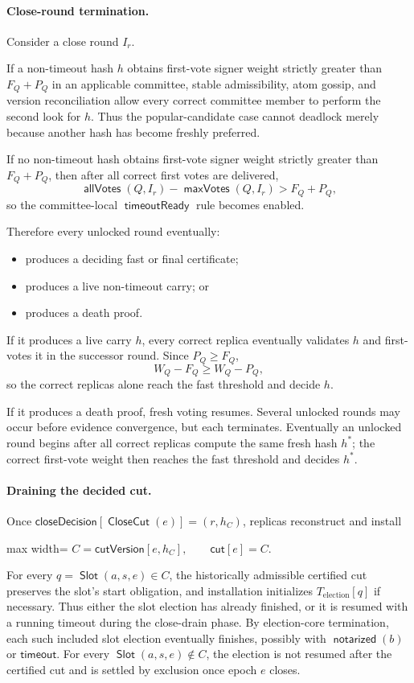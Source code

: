 \documentclass[sigplan,twocolumn,review,anonymous]{acmart}
\newcommand{\func}[1]{\operatorname{\mathsf{#1}}}
\newcommand{\allVotes}{\func{allVotes}}
\newcommand{\maxVotes}{\func{maxVotes}}
\newcommand{\Slot}{\func{Slot}}
\newcommand{\CloseCut}{\func{CloseCut}}
\newcommand{\closeDecision}{\mathsf{closeDecision}}
\newcommand{\timeoutOutcome}{\mathsf{timeout}}
\newcommand{\notarized}{\func{notarized}}
\newcommand{\timeoutReady}{\func{timeoutReady}}
\newcommand{\closeCut}{\mathsf{cut}}
\newcommand{\cutVersion}{\mathsf{cutVersion}}
\begin{document}
\paragraph{Close-round termination.}
Consider a close round \(I_r\).

If a non-timeout hash \(h\) obtains first-vote signer weight strictly greater than \(F_Q+P_Q\) in an
applicable committee, stable admissibility, atom gossip, and version reconciliation allow every correct
committee member to perform the second look for \(h\).  Thus the popular-candidate case cannot deadlock
merely because another hash has become freshly preferred.

If no non-timeout hash obtains first-vote signer weight strictly greater than \(F_Q+P_Q\), then after
all correct first votes are delivered,
\[
\allVotes(Q,I_r)-\maxVotes(Q,I_r)>F_Q+P_Q,
\]
so the committee-local \(\timeoutReady\) rule becomes enabled.

Therefore every unlocked round eventually:
\begin{itemize}
\item produces a deciding fast or final certificate;
\item produces a live non-timeout carry; or
\item produces a death proof.
\end{itemize}

If it produces a live carry \(h\), every correct replica eventually validates \(h\) and first-votes it
in the successor round.  Since \(P_Q\ge F_Q\),
\[
W_Q-F_Q\ge W_Q-P_Q,
\]
so the correct replicas alone reach the fast threshold and decide \(h\).

If it produces a death proof, fresh voting resumes.  Several unlocked rounds may occur before evidence
convergence, but each terminates.  Eventually an unlocked round begins after all correct replicas
compute the same fresh hash \(h^\ast\); the correct first-vote weight then reaches the fast threshold
and decides \(h^\ast\).

\paragraph{Draining the decided cut.}
Once \(\closeDecision[\CloseCut(e)]=(r,h_C)\), replicas reconstruct and install
\begin{center}
\begin{adjustbox}{max width=\columnwidth}
\(\displaystyle
C=\cutVersion[e,h_C],\qquad \closeCut[e]=C.
\)
\end{adjustbox}
\end{center}
For every \(q=\Slot(a,s,e)\in C\), the historically admissible certified cut preserves the slot's start
obligation, and installation initializes \(T_{\mathrm{election}}[q]\) if necessary.  Thus either the slot election has already finished, or it
is resumed with a running timeout during the close-drain phase.  By election-core termination, each
such included slot election eventually
finishes, possibly with \(\notarized(b)\) or \(\timeoutOutcome\).  For every \(\Slot(a,s,e)\notin C\), the election is not
resumed after the certified cut and is settled by exclusion once epoch \(e\) closes.
\end{document}
